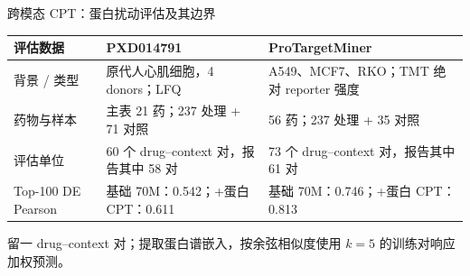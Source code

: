 \begin{frame}[t]{跨模态 CPT：蛋白扰动评估及其边界}
\fontsize{8.8}{12}\selectfont\renewcommand{\arraystretch}{1.14}
\begin{tabularx}{\textwidth}{@{}P{2.9cm}Y Y@{}}
\toprule\textbf{评估数据}&\textbf{PXD014791}&\textbf{ProTargetMiner}\\\midrule
背景 / 类型 & 原代人心肌细胞，4 donors；LFQ & A549、MCF7、RKO；TMT 绝对 reporter 强度\\
药物与样本 & 主表 21 药；237 处理 + 71 对照 & 56 药；237 处理 + 35 对照\\
评估单位 & 60 个 drug--context 对，报告其中 58 对 & 73 个 drug--context 对，报告其中 61 对\\
Top-100 DE Pearson & 基础 70M：0.542；+蛋白 CPT：0.611 & 基础 70M：0.746；+蛋白 CPT：0.813\\
\bottomrule
\end{tabularx}
\vspace{.20cm}
留一 drug--context 对；提取蛋白谱嵌入，按余弦相似度使用 $k=5$ 的训练对响应加权预测。
\end{frame}
